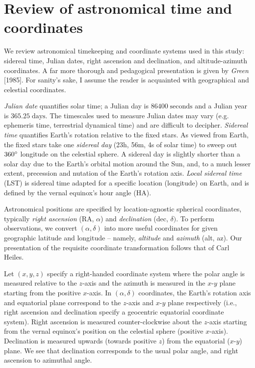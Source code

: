 \documentclass[10pt]{article}
\newcommand {\mt}{\mathrm}
\newcommand {\unit}[1]{\; \mt{#1}}
\begin{document}
\section{Review of astronomical time and coordinates}

We review astronomical timekeeping and coordinate systems used in this study: sidereal time, Julian dates, right ascension and declination, and altitude-azimuth coordinates.
A far more thorough and pedagogical presentation is given by \textit{Green} [1985].
For sanity's sake, I assume the reader is acquainted with geographical and celestial coordinates.

\emph{Julian date} quantifies solar time; a Julian day is $86400 \unit{seconds}$ and a Julian year is $365.25 \unit{days}$.
The timescales used to measure Julian dates may vary (e.g. ephemeris time, terrestrial dynamical time) and are difficult to decipher.
\emph{Sidereal time} quantifies Earth's rotation relative to the fixed stars.
As viewed from Earth, the fixed stars take one \emph{sidereal day} (23h, 56m, 4s of solar time) to sweep out $360\degree$ longitude on the celestial sphere.
A sidereal day is slightly shorter than a solar day due to the Earth's orbital motion around the Sun, and, to a much lesser extent, precession and nutation of the Earth's rotation axis.
\emph{Local sidereal time} (LST) is sidereal time adapted for a specific location (longitude) on Earth, and is defined by the vernal equinox's hour angle (HA).

Astronomical positions are specified by location-agnostic spherical coordinates, typically \emph{right ascension} (RA, $\alpha$) and \emph{declination} (dec, $\delta)$.
To perform observations, we convert $(\alpha, \delta)$ into more useful coordinates for given geographic latitude and longitude -- namely, \emph{altitude} and \emph{azimuth} (alt, az).
Our presentation of the requisite coordinate transformation follows that of Carl Heiles.

Let $(x,y,z)$ specify a right-handed coordinate system where the polar angle is measured relative to the $z$-axis and the azimuth is measured in the $x$-$y$ plane starting from the positive $x$-axis.
In $(\alpha, \delta)$ coordinates, the Earth's rotation axis and equatorial plane correspond to the $z$-axis and $x$-$y$ plane respectively (i.e., right ascension and declination specify a geocentric equatorial coordinate system).
Right ascension is measured counter-clockwise about the $z$-axis starting from the vernal equinox's position on the celestial sphere (positive $x$-axis).
Declination is measured upwards (towards positive $z$) from the equatorial ($x$-$y$) plane.
We see that declination corresponds to the usual polar angle, and right ascension to azimuthal angle.
\end{document}
